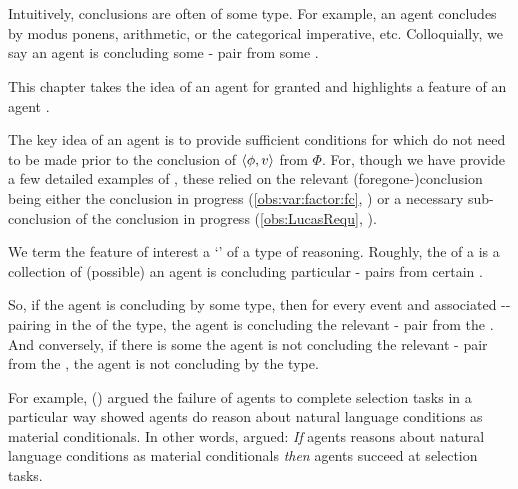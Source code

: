 \chapter{}
\label{cha:typical}
\label{idea:tC}

\nocite{Wilson:1994aa}
\nocite{Goodman:1983aa}

\begin{note}
  Intuitively, conclusions are often of some type.
  For example, an agent concludes by modus ponens, arithmetic, or the categorical imperative, etc.
  Colloquially, we say an agent is \emph{\typeAdj{}} concluding some - pair from some \pool{}.

  This chapter takes the idea of an agent \tCV{} for granted and highlights a feature of an agent \tCV{}.

  The key idea of an agent \tCV{} is to provide sufficient conditions for  which do not need to be made prior to the \agents{} conclusion of \(\langle\phi, v\rangle\) from \(\Phi\).
  For, though we have provide a few detailed examples of , these relied on the relevant (foregone-)conclusion being either the conclusion in progress (\autoref{obs:var:factor:fc}, ) or a necessary sub-conclusion of the conclusion in progress (\autoref{obs:LucasRequ}, ).
\end{note}


\begin{note}
  We term the feature of interest a `\tpro{}' of a type of reasoning.
  Roughly, the \tpro{} of a \torN{} is a collection of (possible)  an agent is concluding particular - pairs from certain .

  So, if the agent is concluding by some type, then for every event and associated -- pairing in the \tpro{} of the type, the agent is concluding the relevant - pair from the .
  And conversely, if there is some  the agent is not concluding the relevant - pair from the , the agent is not concluding by the type.

  For example, \citeauthor{Wason:1966aa} (\citeyear{Wason:1966aa}) argued the failure of agents to complete selection tasks in a particular way showed agents do reason about natural language conditions as material conditionals.
  In other words, \citeauthor{Wason:1966aa} argued:
  \emph{If} agents reasons about natural language conditions as material conditionals \emph{then} agents succeed at selection tasks.
\end{note}


